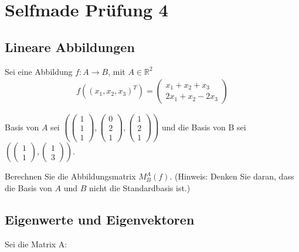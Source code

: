 \chapter{Selfmade Prüfung 4}

\section{Lineare Abbildungen}

Sei eine Abbildung $f : A \rightarrow B$, mit $A \in \mathbb{R}^2$
\begin{align*}
    f\left((x_1, x_2, x_3)^T\right) = \begin{pmatrix}
                                          x_1 + x_2 + x_3 \\
                                          2x_1 + x_2 - 2x_3
                                      \end{pmatrix}
\end{align*}

Basis von $A$ sei $\left(\begin{pmatrix}
            1 \\ 1 \\ 1
        \end{pmatrix}, \begin{pmatrix}
            0 \\ 2 \\ 1
        \end{pmatrix}, \begin{pmatrix}
            1 \\ 2 \\ 1
        \end{pmatrix}\right)$ und die Basis von B sei $\left(\begin{pmatrix}
            1 \\ 1
        \end{pmatrix}, \begin{pmatrix}
            1 \\ 3
        \end{pmatrix}\right)$.

Berechnen Sie die Abbildungsmatrix $M^A_B(f)$. (Hinweis:
Denken Sie daran, dass die Basis von $A$ und $B$ nicht die Standardbasis ist.)

\section{Eigenwerte und Eigenvektoren}

Sei die Matrix A:

